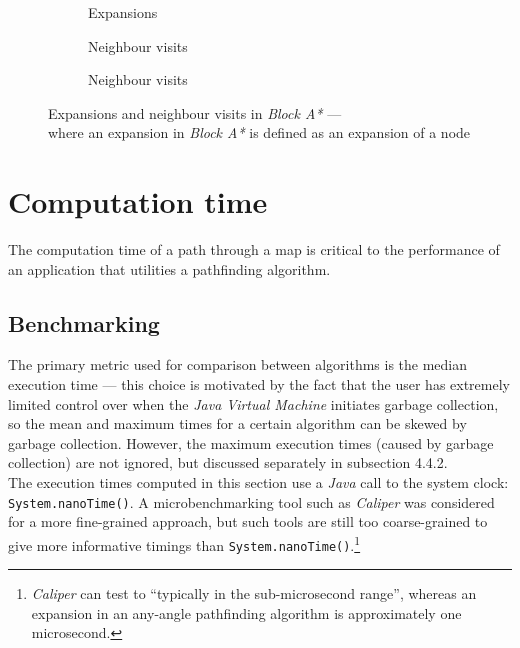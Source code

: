 \documentclass[12pt,notitlepage]{report}
\begin{document}
\newpage

\begin{figure}
\centering
  \begin{subfigure}{0.32\textwidth}
  \centering
  
  \caption{Expansions}
  \end{subfigure}
  \begin{subfigure}{0.32\textwidth}
  \centering
  
  \caption{Neighbour visits}
  \end{subfigure}
  \begin{subfigure}{0.32\textwidth}
  \centering
  
  \caption{Neighbour visits}
  \end{subfigure}
\caption[Expansions and neighbour visits in Block A*]{Expansions and neighbour visits in {\em Block A*} --- \\ where an expansion in {\em Block A*} is defined as an expansion of a node}
\end{figure}

\section{Computation time}
The computation time of a path through a map is critical to the performance of an application that utilities a pathfinding algorithm.

\subsection{Benchmarking}
The primary metric used for comparison between algorithms is the median execution time --- this choice is motivated by the fact that the user has extremely limited control over when the {\em Java Virtual Machine} initiates garbage collection, so the mean and maximum times for a certain algorithm can be skewed by garbage collection. However, the maximum execution times (caused by garbage collection) are not ignored, but discussed separately in subsection 4.4.2.\\

\noindent
The execution times computed in this section use a {\em Java} call to the system clock: {\tt System.nanoTime()}. A microbenchmarking tool such as {\em Caliper}\cite{Caliper} was considered for a more fine-grained approach, but such tools are still too coarse-grained to give more informative timings than {\tt System.nanoTime()}.\footnote{{\em Caliper} can test to ``typically in the sub-microsecond range'', whereas an expansion in an any-angle pathfinding algorithm is approximately one microsecond.}
\end{document}
